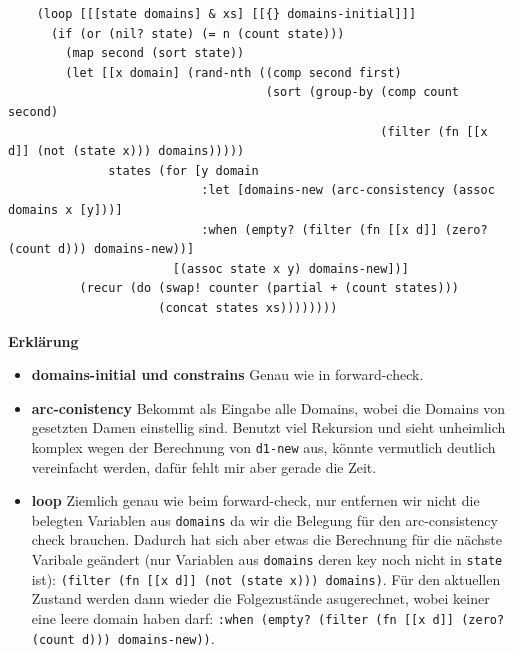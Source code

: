 \documentclass[a4paper,10pt]{article}
\begin{document}
\begin{lstlisting}
    (loop [[[state domains] & xs] [[{} domains-initial]]]
      (if (or (nil? state) (= n (count state)))
        (map second (sort state))
        (let [[x domain] (rand-nth ((comp second first)
                                    (sort (group-by (comp count second)
                                                    (filter (fn [[x d]] (not (state x))) domains)))))
              states (for [y domain
                           :let [domains-new (arc-consistency (assoc domains x [y]))]
                           :when (empty? (filter (fn [[x d]] (zero? (count d))) domains-new))]
                       [(assoc state x y) domains-new])]
          (recur (do (swap! counter (partial + (count states)))
                     (concat states xs))))))))
\end{lstlisting}
\textbf{Erklärung}
\begin{itemize}
  \item \textbf{domains-initial und constrains} Genau wie in forward-check.
    \item \textbf{arc-conistency} Bekommt als Eingabe alle Domains, wobei die Domains von gesetzten Damen einstellig sind. Benutzt viel Rekursion und sieht unheimlich komplex wegen der Berechnung von \texttt{d1-new} aus, könnte vermutlich deutlich vereinfacht werden, dafür fehlt mir aber gerade die Zeit.
    \item \textbf{loop} Ziemlich genau wie beim forward-check, nur entfernen wir nicht die belegten Variablen aus \texttt{domains} da wir die Belegung für den arc-consistency check brauchen. Dadurch hat sich aber etwas die Berechnung für die nächste Varibale geändert (nur Variablen aus \texttt{domains} deren key noch nicht in \texttt{state} ist): \texttt{(filter (fn [[x d]] (not (state x))) domains)}. Für den aktuellen Zustand werden dann wieder die Folgezustände asugerechnet, wobei keiner eine leere domain haben darf: \texttt{:when (empty? (filter (fn [[x d]] (zero? (count d))) domains-new))}. 
\end{itemize}
\newpage
\end{document}
